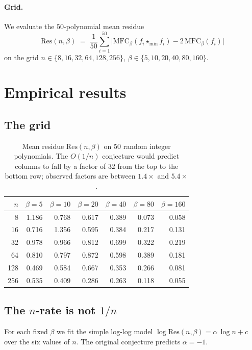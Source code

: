 \documentclass[11pt,a4paper]{article}
\begin{document}
\paragraph{Grid.}
We evaluate the $50$-polynomial mean residue
\[
\mathrm{Res}(n,\beta)
\;=\;
\frac{1}{50}\sum_{i=1}^{50}
\bigl|\mathrm{MFC}_\beta(f_i \star_{\min} f_i) - 2\,\mathrm{MFC}_\beta(f_i)\bigr|
\]
on the grid
$n \in \{8, 16, 32, 64, 128, 256\}$,
$\beta \in \{5, 10, 20, 40, 80, 160\}$.

\section{Empirical results}\label{sec:results}

\subsection{The grid}

\begin{table}[h]
\centering
\small
\begin{tabular}{r r r r r r r}
\toprule
$n$ & $\beta=5$ & $\beta=10$ & $\beta=20$ & $\beta=40$ & $\beta=80$ & $\beta=160$ \\
\midrule
8   & 1.186 & 0.768 & 0.617 & 0.389 & 0.073 & 0.058 \\
16  & 0.716 & 1.356 & 0.595 & 0.384 & 0.217 & 0.131 \\
32  & 0.978 & 0.966 & 0.812 & 0.699 & 0.322 & 0.219 \\
64  & 0.810 & 0.797 & 0.872 & 0.598 & 0.389 & 0.181 \\
128 & 0.469 & 0.584 & 0.667 & 0.353 & 0.266 & 0.081 \\
256 & 0.535 & 0.409 & 0.286 & 0.263 & 0.118 & 0.055 \\
\bottomrule
\end{tabular}
\caption{Mean residue $\mathrm{Res}(n,\beta)$ on $50$ random integer
polynomials. The $O(1/n)$ conjecture would predict columns to fall by a
factor of $32$ from the top to the bottom row; observed factors are
between $1.4\times$ and $5.4\times$.}
\label{tab:grid}
\end{table}

\subsection{The $n$-rate is not $1/n$}\label{sec:n-rate}

For each fixed $\beta$ we fit the simple log-log model
$\log \mathrm{Res}(n,\beta) = \alpha\,\log n + c$ over the six values of $n$.
The original conjecture predicts $\alpha = -1$.
\end{document}
